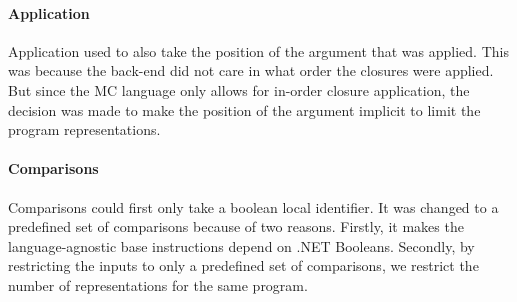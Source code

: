 \paragraph{Application} Application used to also take the position of the argument that was applied.
This was because the back-end did not care in what order the closures were applied.
But since the MC language only allows for in-order closure application, the decision was made to make the position of the argument implicit to limit the program representations.

\paragraph{Comparisons} Comparisons could first only take a boolean local identifier.
It was changed to a predefined set of comparisons because of two reasons.
Firstly, it makes the language-agnostic base instructions depend on .NET Booleans.
Secondly, by restricting the inputs to only a predefined set of comparisons, we restrict the number of representations for the same program.

